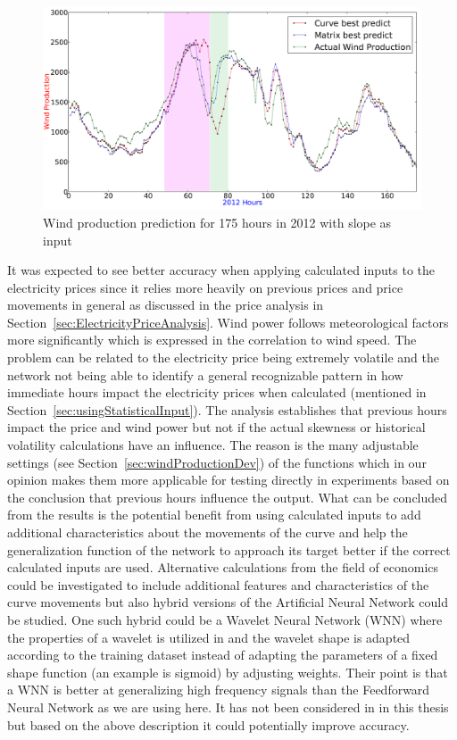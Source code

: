 \begin{figure}[H]
\centering
\includegraphics[width=0.99\linewidth]{billeder/curveAnalysisWindProduction.png}
\caption{Wind production prediction for 175 hours in 2012 with slope as input}
\label{fig:basicCurveAnalysisGraphoForDiscussion}
\end{figure}

It was expected to see better accuracy when applying calculated inputs to the electricity prices since it relies more heavily on previous prices and price movements in general as discussed in the price analysis in Section~\ref{sec:ElectricityPriceAnalysis}. Wind power follows meteorological factors more significantly which is expressed in the correlation to wind speed. The problem can be related to the electricity price being extremely volatile and the network not being able to identify a general recognizable pattern in how immediate hours impact the electricity prices when calculated (mentioned in Section~\ref{sec:usingStatisticalInput}). The analysis establishes that previous hours impact the price and wind power but not if the actual skewness or historical volatility calculations have an influence. The reason is the many adjustable settings (see Section~\ref{sec:windProductionDev}) of the functions which in our opinion makes them more applicable for testing directly in experiments based on the conclusion that previous hours influence the output. What can be concluded from the results is the potential benefit from using calculated inputs to add additional characteristics about the movements of the curve and help the generalization function of the network to approach its target better if the correct calculated inputs are used. Alternative calculations from the field of economics could be investigated to include additional features and characteristics of the curve movements but also hybrid versions of the Artificial Neural Network could be studied. One such hybrid could be a Wavelet Neural Network (WNN) where the properties of a wavelet is utilized in \cite{adaptiveWaveletANNElectricityMarkets} and the wavelet shape is adapted according to the training dataset instead of adapting the parameters of a fixed shape function (an example is sigmoid) by adjusting weights. Their point is that a WNN is better at generalizing high frequency signals than the Feedforward Neural Network as we are using here. It has not been considered in in this thesis but based on the above description it could potentially improve accuracy. 
